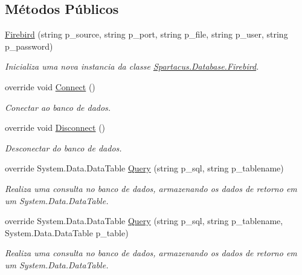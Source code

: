 \subsection*{Métodos Públicos}
\begin{DoxyCompactItemize}
\item 
\hyperlink{classSpartacus_1_1Database_1_1Firebird_ad561c2ad372a44fc785238e72dbc10b4}{Firebird} (string p\+\_\+source, string p\+\_\+port, string p\+\_\+file, string p\+\_\+user, string p\+\_\+password)
\begin{DoxyCompactList}\small\item\em Inicializa uma nova instancia da classe \hyperlink{classSpartacus_1_1Database_1_1Firebird}{Spartacus.\+Database.\+Firebird}. \end{DoxyCompactList}\item 
override void \hyperlink{classSpartacus_1_1Database_1_1Firebird_a9d3d6ee076fcae78c7f035667bd9539d}{Connect} ()
\begin{DoxyCompactList}\small\item\em Conectar ao banco de dados. \end{DoxyCompactList}\item 
override void \hyperlink{classSpartacus_1_1Database_1_1Firebird_a0b0b56b3a71ef80ea8662547e24acb47}{Disconnect} ()
\begin{DoxyCompactList}\small\item\em Desconectar do banco de dados. \end{DoxyCompactList}\item 
override System.\+Data.\+Data\+Table \hyperlink{classSpartacus_1_1Database_1_1Firebird_a10235140b612dd5b178169461962d2df}{Query} (string p\+\_\+sql, string p\+\_\+tablename)
\begin{DoxyCompactList}\small\item\em Realiza uma consulta no banco de dados, armazenando os dados de retorno em um System.\+Data.\+Data\+Table. \end{DoxyCompactList}\item 
override System.\+Data.\+Data\+Table \hyperlink{classSpartacus_1_1Database_1_1Firebird_a6243d18345e2b5f44ddcda032f6b2b9e}{Query} (string p\+\_\+sql, string p\+\_\+tablename, System.\+Data.\+Data\+Table p\+\_\+table)
\begin{DoxyCompactList}\small\item\em Realiza uma consulta no banco de dados, armazenando os dados de retorno em um System.\+Data.\+Data\+Table. \end{DoxyCompactList}\item 

\end{DoxyCompactItemize}
